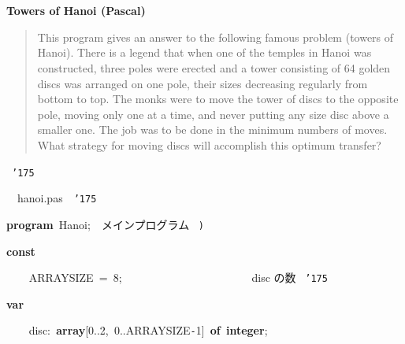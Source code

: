\documentclass[a4paper,10pt]{article}
\def\mc{\relax}
\begin{document}
\tt\mc 

\noindent
\mbox{}\rm\mc {\tt\char'173}\  \hrulefill 
\tt\mc 

\noindent
\mbox{}\rm\mc {\tt\mc \ }
\tt\mc 

\noindent
\mbox{}\rm\mc \ %

\centerline{\bf Towers of Hanoi (Pascal)}
 
\begin{quote}

This program gives an answer to the following famous problem (towers of
Hanoi).
There is a legend that when one of the temples in Hanoi was constructed,
three poles were erected and a tower consisting of 64 golden discs was
arranged on one pole, their sizes decreasing regularly from bottom to top.
The monks were to move the tower of discs to the opposite pole, moving
only one at a time, and never putting any size disc above a smaller one.
The job was to be done in the minimum numbers of moves. What strategy for
moving discs will accomplish this optimum transfer?
\end{quote}

\tt\mc 

\noindent
\mbox{}\hfill

\noindent
\mbox{}\rm\mc \hrulefill \rm\mc \ {\tt\char'175}
\tt\mc 

\noindent
\mbox{}\hfill

\noindent
\mbox{}\rm\mc {\tt\char'173}\  \hrulefill\ hanoi.pas\ \hrulefill \rm\mc \ {\tt\char'175}
\tt\mc 

\noindent
\mbox{}\hfill

\noindent
\mbox{}\textbf{program}{\tt\mc \ }Hanoi;{\tt\mc \ }\rm\mc {\tt (}{\tt *}\  メインプログラム \rm\mc \ {\tt *}{\tt )}
\tt\mc 

\noindent
\mbox{}\hfill

\noindent
\mbox{}\textbf{const}

\noindent
\mbox{}{\tt\mc \ }{\tt\mc \ }{\tt\mc \ }{\tt\mc \ }ARRAYSIZE{\tt\mc \ }={\tt\mc \ }8;{\tt\mc \ }{\tt\mc \ }{\tt\mc \ }{\tt\mc \ }{\tt\mc \ }{\tt\mc \ }{\tt\mc \ }{\tt\mc \ }{\tt\mc \ }{\tt\mc \ }{\tt\mc \ }{\tt\mc \ }{\tt\mc \ }{\tt\mc \ }{\tt\mc \ }{\tt\mc \ }{\tt\mc \ }{\tt\mc \ }{\tt\mc \ }{\tt\mc \ }{\tt\mc \ }{\tt\mc \ }\rm\mc {\tt\char'173}\  disc の数 \rm\mc \ {\tt\char'175}
\tt\mc 

\noindent
\mbox{}\hfill

\noindent
\mbox{}\textbf{var}

\noindent
\mbox{}{\tt\mc \ }{\tt\mc \ }{\tt\mc \ }{\tt\mc \ }disc:{\tt\mc \ }\textbf{array}[0..2,{\tt\mc \ }0..ARRAYSIZE{\tt -}1]{\tt\mc \ }\textbf{of}{\tt\mc \ }\textbf{integer};
\end{document}
